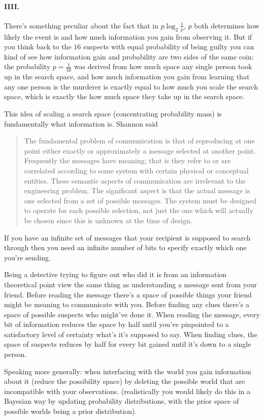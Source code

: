 \paragraph{IIII.}
There's something peculiar about the fact that in $p\log_2{\frac{1}{p}}$, $p$ both determines how likely the event is and how much information you gain from observing it. But if you think back to the $16$ suspects with equal probability of being guilty you can kind of see how information gain and probability are two sides of the same coin: the probability $p=\frac{1}{16}$ was derived from how much space any single person took up in the search space, and how much information you gain from learning that any one person is the murderer is exactly equal to how much you scale the search space, which is exactly the how much space they take up in the search space.
\par
This idea of scaling a search space (concentrating probability mass) is fundamentally what information is. Shannon said
\begin{quote}
    The fundamental problem of communication is that of reproducing at one point either exactly or approximately a message selected at another point. Frequently the messages have meaning; that is they refer
    to or are correlated according to some system with certain physical or conceptual entities. These semantic
    aspects of communication are irrelevant to the engineering problem. The significant aspect is that the actual
    message is one selected from a set of possible messages. The system must be designed to operate for each
    possible selection, not just the one which will actually be chosen since this is unknown at the time of design.
\end{quote}
If you have an infinite set of messages that your recipient is supposed to search through then you need an infinite number of bits to specify exactly which one you're sending.\par
Being a detective trying to figure out who did it is from an information theoretical point view the same thing as understanding a message sent from your friend. Before reading the message there's a space of possible things your friend might be meaning to communicate with you. Before finding any clues there's a space of possible suspects who might've done it. When reading the message, every bit of information reduces the space by half until you've pinpointed to a satisfactory level of certainty what's it's supposed to say. When finding clues, the space of suspects reduces by half for every bit gained until it's down to a single person. 
\par
Speaking more generally: when interfacing with the world you gain information about it (reduce the possibility space) by deleting the possible world that are incompatible with your observations. (realistically you would likely do this in a Bayesian way by updating probability distributions, with the prior space of possible worlds being a prior distribution).
\par

